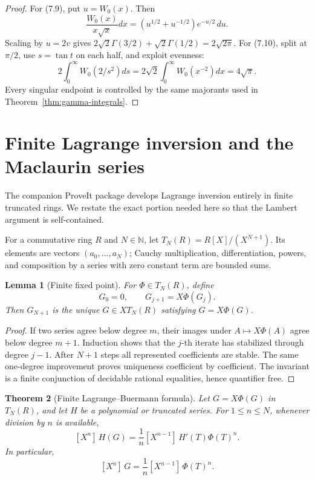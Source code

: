 \documentclass[11pt]{article}
\newtheorem{theorem}{Theorem}[section]
\newtheorem{lemma}[theorem]{Lemma}
\theoremstyle{definition}
\newcommand{\N}{\mathbb N}
\newcommand{\coeff}[2]{[X^{#1}]\,#2}
\begin{document}
\begin{proof}
For (7.9), put \(u=W_0(x)\).  Then
\[
 \frac{W_0(x)}{x\sqrt{x}}dx
 =(u^{1/2}+u^{-1/2})e^{-u/2}\,du.
\]
Scaling by \(u=2v\) gives
\(2\sqrt2\Gamma(3/2)+\sqrt2\Gamma(1/2)=2\sqrt{2\pi}\).
For (7.10), split at \(\pi/2\), use \(s=\tan t\) on each half, and exploit
evenness:
\[
 2\int_0^\infty W_0(2/s^2)ds
 =2\sqrt2\int_0^\infty W_0(x^{-2})dx=4\sqrt\pi.
\]
Every singular endpoint is controlled by the same majorants used in
Theorem~\ref{thm:gamma-integrals}.
\end{proof}

\section{Finite Lagrange inversion and the Maclaurin series}\label{sec:series}

The companion ProveIt package develops Lagrange inversion entirely in finite
truncated rings.  We restate the exact portion needed here so that the Lambert
argument is self-contained.

For a commutative ring \(R\) and \(N\in\N\), let
\(T_N(R)=R[X]/(X^{N+1})\).  Its elements are vectors
\((a_0,\ldots,a_N)\); Cauchy multiplication, differentiation, powers, and
composition by a series with zero constant term are bounded sums.

\begin{lemma}[Finite fixed point]\label{lem:finite-fix}
For \(\Phi\in T_N(R)\), define
\[
 G_0=0,\qquad G_{j+1}=X\Phi(G_j).
\]
Then \(G_{N+1}\) is the unique \(G\in XT_N(R)\) satisfying
\(G=X\Phi(G)\).
\end{lemma}

\begin{proof}
If two series agree below degree \(m\), their images under
\(A\mapsto X\Phi(A)\) agree below degree \(m+1\).  Induction shows that the
\(j\)-th iterate has stabilized through degree \(j-1\).  After \(N+1\) steps
all represented coefficients are stable.  The same one-degree improvement
proves uniqueness coefficient by coefficient.  The invariant is a finite
conjunction of decidable rational equalities, hence quantifier free.
\end{proof}

\begin{theorem}[Finite Lagrange--Buermann formula]\label{thm:lagrange}
Let \(G=X\Phi(G)\) in \(T_N(R)\), and let \(H\) be a polynomial or truncated
series.  For \(1\le n\le N\), whenever division by \(n\) is available,
\[
 \coeff{n}{H(G)}=\frac1n\coeff{n-1}{H'(T)\Phi(T)^n}.
 \tag{8.1}
\]
In particular,
\[
 \coeff{n}{G}=\frac1n\coeff{n-1}{\Phi(T)^n}.
 \tag{8.2}
\]
\end{theorem}
\end{document}
